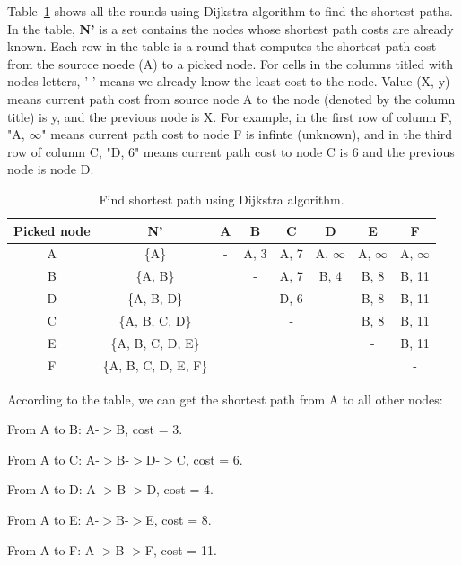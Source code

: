\documentclass{article}
\begin{document}
Table~\ref{tab:dijkstra} shows all the rounds using Dijkstra algorithm to find the shortest paths. In the table, \textbf{N'} is a set contains the nodes whose shortest path costs are already known. Each row in the table is a round that computes the shortest path cost from the sourcce noede (A) to a picked node. For cells in the columns titled with nodes letters, '-' means we already know the least cost to the node. Value (X, y) means current path cost from source node A to the node (denoted by the column title) is y, and the previous node is X. For example, in the first row of column F, "A, $\infty$" means current path cost to node F is infinte (unknown), and in the third row of column C, "D, 6" means current path cost to node C is 6 and the previous node is node D.

\begin{table}[h!]
    \begin{center}
      \caption{Find shortest path using Dijkstra algorithm.}
      \label{tab:dijkstra}
      \begin{tabular}{c|c|c|c|c|c|c|c} %
        \toprule
        \textbf{Picked node}& \textbf{N'}& \textbf{A}&\textbf{B}&\textbf{C}&\textbf{D}&\textbf{E}&\textbf{F}\\
        \hline
        A&\{A\}&-&A, 3&A, 7&A, $\infty$&A, $\infty$&A, $\infty$\\
        \hline
        B&\{A, B\}&&-&A, 7&B, 4&B, 8&B, 11\\
        \hline
        D&\{A, B, D\}&&&D, 6&-&B, 8&B, 11\\
        \hline
        C&\{A, B, C, D\}&&&-&&B, 8&B, 11\\
        \hline
        E&\{A, B, C, D, E\}&&&&&-&B, 11\\
        \hline
        F&\{A, B, C, D, E, F\}&&&&&&-\\
        \bottomrule
      \end{tabular}
    \end{center}
  \end{table}

According to the table, we can get the shortest path from A to all other nodes:

From A to B: A-$>$B, cost = 3.

From A to C: A-$>$B-$>$D-$>$C, cost = 6.

From A to D: A-$>$B-$>$D, cost = 4.

From A to E: A-$>$B-$>$E, cost = 8.

From A to F: A-$>$B-$>$F, cost = 11.
\end{document}
